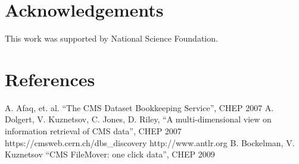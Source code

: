 \documentclass[a4paper]{jpconf}
\begin{document}
\section{Acknowledgements}

This work was supported by National Science Foundation.

\section*{References}
\begin{thebibliography}{9}
 A. Afaq, et. al. ``The CMS Dataset Bookkeeping Service'', CHEP 2007 
 A. Dolgert, V. Kuznetsov, C. Jones, D. Riley, 
``A multi-dimensional view on information retrieval of CMS data'', CHEP 2007
 https://cmsweb.cern.ch/dbs\_discovery
 http://www.antlr.org
 B. Bockelman, V. Kuznetsov ``CMS FileMover: one click data'', CHEP 2009

\end{thebibliography}
\end{document}
